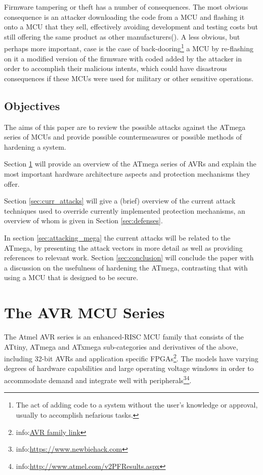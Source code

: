 \documentclass[10pt,a4paper,twocolumn]{article}
\begin{document}
	Firmware tampering or theft has a number of consequences. The most obvious consequence is an attacker downloading the code from a MCU and flashing it onto a MCU that they sell, effectively avoiding development and testing costs but still offering the same product as other manufacturers(\cite{tech:aes_bls}). A less obvious, but perhaps more important, case is the case of back-dooring\footnote{The act of adding code to a system without the user's knowledge or approval, usually to accomplish nefarious tasks.} a MCU by re-flashing on it a modified version of the firmware with coded added by the attacker in order to accomplish their malicious intents, which could have disastrous consequences if these MCUs were used for military or other sensitive operations. 

	\subsection{Objectives}
	The aims of this paper are to review the possible attacks against the ATmega series of MCUs and provide possible countermeasures or possible methods of hardening a system. 
	
	Section \ref{sec:atmega_overview} will provide an overview of the ATmega series of AVRs and explain the most important hardware architecture aspects and protection mechanisms they offer. 
	
	Section \ref{sec:curr_attacks} will give a (brief) overview of the current attack techniques used to override currently implemented protection mechanisms, an overview of whom is given in Section \ref{sec:defenses}. 
	
	In section \ref{sec:attacking_mega} the current attacks will be related to the ATmega, by presenting the attack vectors in more detail as well as providing references to relevant work. Section \ref{sec:conclusion} will conclude the paper with a discussion on the usefulness of hardening the ATmega, contrasting that with using a MCU that is designed to be secure.
	
\section{The AVR MCU Series}
\label{sec:atmega_overview}

	The Atmel AVR series is an enhanced-RISC MCU family that consists of the ATtiny, ATmega and ATxmega sub-categories and derivatives of the above, including 32-bit AVRs and application specific FPGAs\footnote{info:\href{http://www.atmel.com/products/microcontrollers/avr/default.aspx}{AVR family link}}. The models have varying degrees of hardware capabilities and large operating voltage windows in order to accommodate demand and integrate well with peripherals\footnote{info:\href{https://www.newbiehack.com/MicrocontrollersAlternativePowerSources.aspx}{https://www.newbiehack.com}}\footnote{info:\href{http://www.atmel.com/v2PFResults.aspx}{http://www.atmel.com/v2PFResults.aspx}}.
	
\end{document}
